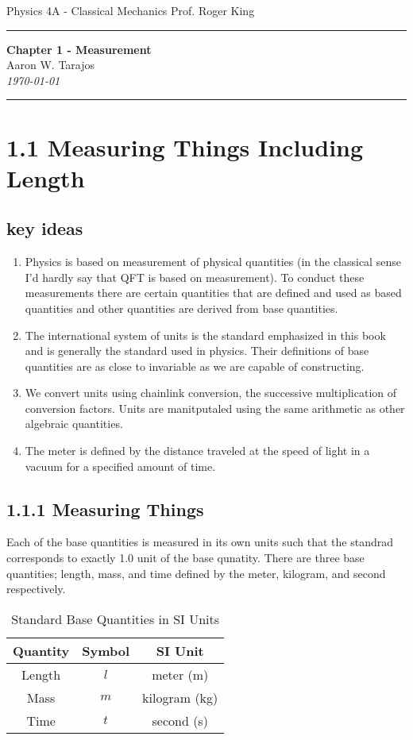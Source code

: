 \documentclass{article}
\begin{document}
\noindent
Physics 4A - Classical Mechanics \hfill Prof. Roger King

\noindent\rule{\textwidth}{0.4pt}

\begin{center}
    \textbf{\LARGE Chapter 1 - Measurement} \\
    \vspace{12pt}
    \large Aaron W. Tarajos \\
    \textit{\today}
\end{center}

\noindent\rule{\textwidth}{0.4pt}

\section*{1.1 Measuring Things Including Length}

\subsection*{key ideas}
\begin{enumerate}
	\item Physics is based on measurement of physical quantities (in the classical sense I'd hardly say that QFT is based on measurement). To conduct these measurements there are certain quantities that are defined and used as based quantities and other quantities are derived from base quantities.
	\item The international system of units is the standard emphasized in this book and is generally the standard used in physics. Their definitions of base quantities are as close to invariable as we are capable of constructing.
	\item We convert units using chainlink conversion, the successive multiplication of conversion factors. Units are manitputaled using the same arithmetic as other algebraic quantities.
	\item The meter is defined by the distance traveled at the speed of light in a vacuum for a specified amount of time.
\end{enumerate}

\subsection*{1.1.1 Measuring Things}

Each of the base quantities is measured in its own units such that the standrad corresponds to exactly 1.0 unit of the base qunatity. There are three base quantities; length, mass, and time defined by the meter, kilogram, and second respectively.
\begin{table}[h]
    \centering
    \begin{tabular}{c|c|c}
	\textbf{Quantity} & \textbf{Symbol} & \textbf{SI Unit} \\ \hline
	Length & $l$ & meter (m) \\
	Mass & $m$ & kilogram (kg) \\
	Time & $t$ & second (s) \\
    \end{tabular}
    \caption{Standard Base Quantities in SI Units}
    \label{tab:base_quantities}
\end{table}
\end{document}
